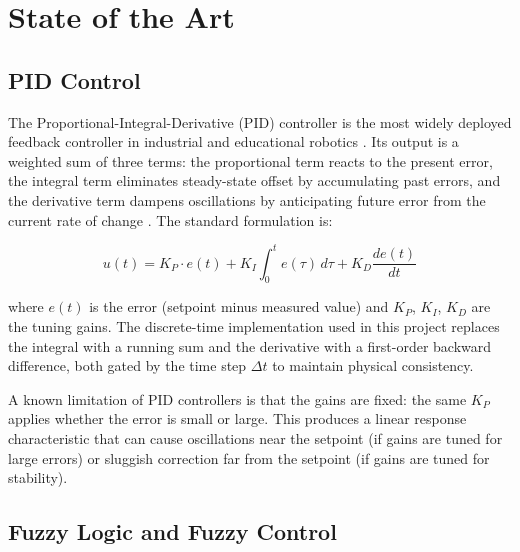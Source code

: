 
\chapter{State of the Art}
\label{ch:state-of-art}

\section{PID Control}
\label{sec:sota-pid}

The Proportional-Integral-Derivative (PID) controller is the most widely deployed feedback controller in industrial and educational robotics \cite{astrom2006}. Its output is a weighted sum of three terms: the proportional term reacts to the present error, the integral term eliminates steady-state offset by accumulating past errors, and the derivative term dampens oscillations by anticipating future error from the current rate of change \cite{ogata2010}. The standard formulation is:

\begin{equation}
    u(t) = K_P \cdot e(t) + K_I \int_0^t e(\tau)\,d\tau + K_D \frac{de(t)}{dt}
    \label{eq:pid}
\end{equation}

where $e(t)$ is the error (setpoint minus measured value) and $K_P$, $K_I$, $K_D$ are the tuning gains. The discrete-time implementation used in this project replaces the integral with a running sum and the derivative with a first-order backward difference, both gated by the time step $\Delta t$ to maintain physical consistency.

A known limitation of PID controllers is that the gains are fixed: the same $K_P$ applies whether the error is small or large. This produces a linear response characteristic that can cause oscillations near the setpoint (if gains are tuned for large errors) or sluggish correction far from the setpoint (if gains are tuned for stability).

\section{Fuzzy Logic and Fuzzy Control}
\label{sec:sota-fuzzy}


